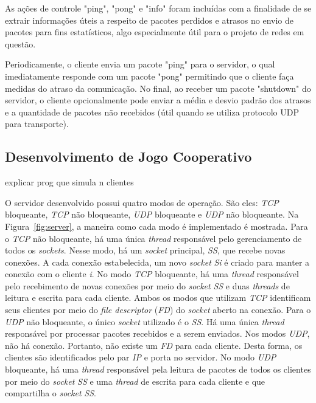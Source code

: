 \documentclass[12pt]{article}
\begin{document}
As ações de controle "ping", "pong" e "info" foram incluídas com a finalidade
de se extrair informações úteis a respeito de pacotes perdidos e atrasos no
envio de pacotes para fins estatísticos, algo especialmente útil para o projeto
de redes em questão.

Periodicamente, o cliente envia um pacote "ping" para o servidor, o qual
imediatamente responde com um pacote "pong" permitindo que o cliente faça
medidas do atraso da comunicação.  No final, ao receber um pacote "shutdown" do
servidor, o cliente opcionalmente pode enviar a média e desvio padrão dos
atrasos e a quantidade de pacotes não recebidos (útil quando se utiliza
protocolo UDP para transporte).

\subsection{Desenvolvimento de Jogo Cooperativo} \label{sub:desenvolvimento}

explicar prog que simula n clientes

O servidor desenvolvido possui quatro modos de operação. São eles: \emph{TCP} bloqueante, \emph{TCP} não bloqueante, \emph{UDP} bloqueante e \emph{UDP} não bloqueante. Na Figura~\ref{fig:server}, a maneira como cada modo é implementado é mostrada. Para o \emph{TCP} não bloqueante, há uma única \emph{thread} responsável pelo gerenciamento de todos os \emph{sockets}. Nesse modo, há um \emph{socket} principal, \emph{SS}, que recebe novas conexões. A cada conexão estabelecida, um novo \emph{socket} \emph{Si} é criado para manter a conexão com o cliente \emph{i}. No modo \emph{TCP} bloqueante, há uma \emph{thread} responsável pelo recebimento de novas conexões por meio do \emph{socket} \emph{SS} e duas \emph{threads} de leitura e escrita para cada cliente. Ambos os modos que utilizam \emph{TCP} identificam seus clientes por meio do \emph{file descriptor} (\emph{FD}) do \emph{socket} aberto na conexão. Para o \emph{UDP} não bloqueante, o único \emph{socket} utilizado é o \emph{SS}. Há uma única \emph{thread} responsável por processar pacotes recebidos e a serem enviados. Nos modos \emph{UDP}, não há conexão. Portanto, não existe um \emph{FD} para cada cliente. Desta forma, os clientes são identificados pelo par \emph{IP} e porta no servidor. No modo \emph{UDP} bloqueante, há uma \emph{thread} responsável pela leitura de pacotes de todos os clientes por meio do \emph{socket} \emph{SS} e uma \emph{thread} de escrita para cada cliente e que compartilha o \emph{socket} \emph{SS}. 
\end{document}
